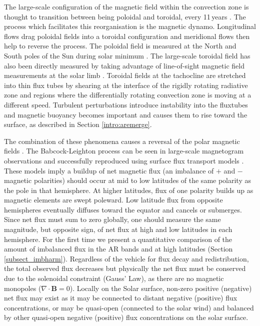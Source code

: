 The large-scale configuration of the magnetic field within the convection zone is thought to transition between being poloidal and toroidal, every 11\,years \citep{Parker:1955}. The process which facilitates this reorganisation is the magnetic dynamo. Longitudinal flows drag poloidal fields into a toroidal configuration and meridional flows then help to reverse the process. The poloidal field is measured at the North and South poles of the Sun during solar minimum \citep{Harvey:2002}. The large-scale toroidal field has also been directly measured by taking advantage of line-of-sight magnetic field measurements at the solar limb \citep{Ulrich:2005}. Toroidal fields at the tachocline are stretched into thin flux tubes by shearing at the interface of the rigidly rotating radiative zone and regions where the differentially rotating convection zone is moving at a different speed. Turbulent perturbations introduce instability into the \glspl{fluxtube} and magnetic buoyancy becomes important and causes them to rise toward the surface, as described in Section \ref{intro:aremerge}.

The combination of these phenomena causes a reversal of the polar magnetic fields \citep{Babcock:1961,Leighton:1964}. The Babcock-Leighton process can be seen in large-scale magnetogram observations \citep{Harvey:1992} and successfully reproduced using surface flux transport models \citep{Wang:1989,Schrijver:2003}. These models imply a buildup of net magnetic flux (an imbalance of $+$ and $-$ magnetic polarities) should occur at mid to low latitudes of the same polarity as the pole in that hemisphere. At higher latitudes, flux of one polarity builds up as magnetic elements are swept poleward. Low latitude flux from opposite hemispheres eventually diffuses toward the equator and cancels or submerges. Since net flux must sum to zero globally, one should measure the same magnitude, but opposite sign, of net flux at high and low latitudes in each hemisphere. For the first time we present a quantitative comparison of the amount of imbalanced flux in the AR bands and at high latitudes (Section \ref{subsect_imbharm}).
Regardless of the vehicle for flux decay and redistribution, the total observed flux decreases but physically the net flux must be conserved due to the solenoidal constraint (Gauss' Law), as there are no magnetic monopoles ($\nabla\cdot\mathbf{B}=0$).
Locally on the Solar surface, non-zero positive (negative) net flux may exist as it may be connected to distant negative (positive) flux concentrations, or may be quasi-open (connected to the solar wind) and balanced by other quasi-open negative (positive) flux concentrations on the solar surface.

